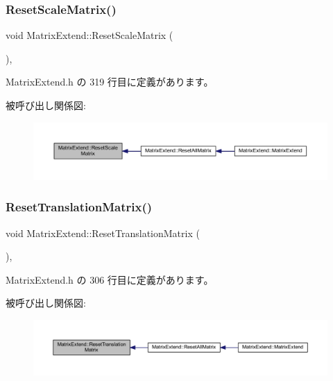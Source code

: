 \subsubsection{\texorpdfstring{Reset\+Scale\+Matrix()}{ResetScaleMatrix()}}
{\footnotesize\ttfamily void Matrix\+Extend\+::\+Reset\+Scale\+Matrix (\begin{DoxyParamCaption}{ }\end{DoxyParamCaption})\hspace{0.3cm}{\ttfamily [inline]}, {\ttfamily [private]}}



 Matrix\+Extend.\+h の 319 行目に定義があります。

被呼び出し関係図\+:\nopagebreak
\begin{figure}[H]
\begin{center}
\leavevmode
\includegraphics[width=350pt]{class_matrix_extend_a1932807f81cebd1d4d101ad4be13e55d_icgraph}
\end{center}
\end{figure}
\mbox{\label{class_matrix_extend_aea89536d6cbcc73909ee79111f13dd28}} 
\subsubsection{\texorpdfstring{Reset\+Translation\+Matrix()}{ResetTranslationMatrix()}}
{\footnotesize\ttfamily void Matrix\+Extend\+::\+Reset\+Translation\+Matrix (\begin{DoxyParamCaption}{ }\end{DoxyParamCaption})\hspace{0.3cm}{\ttfamily [inline]}, {\ttfamily [private]}}



 Matrix\+Extend.\+h の 306 行目に定義があります。

被呼び出し関係図\+:\nopagebreak
\begin{figure}[H]
\begin{center}
\leavevmode
\includegraphics[width=350pt]{class_matrix_extend_aea89536d6cbcc73909ee79111f13dd28_icgraph}
\end{center}
\end{figure}
\mbox{\label{class_matrix_extend_a06d4bd42be11fba786917bef61a4e66d}} 
